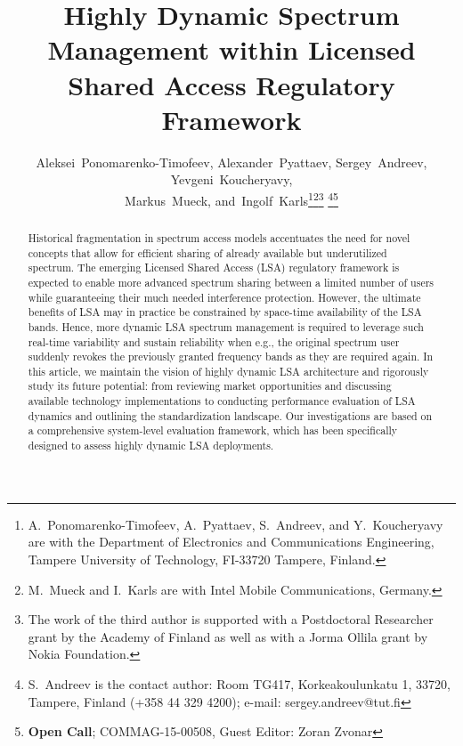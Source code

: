 \documentclass[journal]{IEEEtran}
\begin{document}
\title{Highly Dynamic Spectrum Management within Licensed Shared Access Regulatory Framework}


\author{Aleksei~Ponomarenko-Timofeev, Alexander~Pyattaev, Sergey~Andreev, Yevgeni~Koucheryavy,\\ Markus~Mueck, and~Ingolf~Karls\thanks{A.~Ponomarenko-Timofeev, A.~Pyattaev, S.~Andreev, and Y.~Koucheryavy are with the Department of Electronics and Communications Engineering, 
Tampere University of Technology, FI-33720 Tampere, Finland.}\thanks{M.~Mueck and I.~Karls are with Intel Mobile Communications, Germany.}\thanks{The work of the third author is supported with a Postdoctoral Researcher grant by the Academy of Finland as well as with a Jorma Ollila grant by Nokia Foundation.}
\thanks{S.~Andreev is the contact author: Room TG417, Korkeakoulunkatu 1, 33720, Tampere, Finland (+358 44 329 4200); e-mail: sergey.andreev@tut.fi}\thanks{\textbf{Open Call}; COMMAG-15-00508, Guest Editor: Zoran Zvonar}
}



\maketitle

\begin{abstract}
Historical fragmentation in spectrum access models accentuates the need for novel concepts that allow for efficient sharing of already available but underutilized spectrum. The emerging Licensed Shared Access (LSA) regulatory framework is expected to enable more advanced spectrum sharing between a limited number of users while guaranteeing their much needed interference protection. However, the ultimate benefits of LSA may in practice be constrained by space-time availability of the LSA bands. Hence, more dynamic LSA spectrum management is required to leverage such real-time variability and sustain reliability when e.g., the original spectrum user suddenly revokes the previously granted frequency bands as they are required again. In this article, we maintain the vision of highly dynamic LSA architecture and rigorously study its future potential: from reviewing market opportunities and discussing available technology implementations to conducting performance evaluation of LSA dynamics and outlining the standardization landscape. Our investigations are based on a comprehensive system-level evaluation framework, which has been specifically designed to assess highly dynamic LSA deployments.
\end{abstract}
\end{document}
